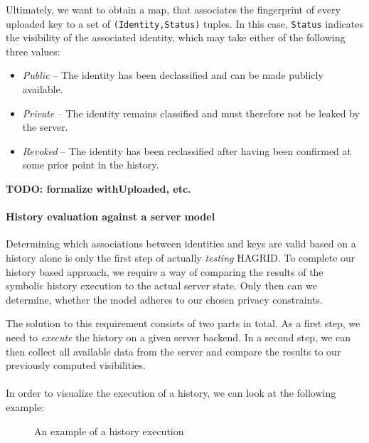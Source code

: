 Ultimately, we want to obtain a map, that associates the fingerprint of every uploaded key to a set of \texttt{(Identity,Status)} tuples. In this case, \texttt{Status} indicates the visibility of the associated identity, which may take either of the following three values: 
\begin{itemize}
    \item \emph{Public} -- The identity has been declassified and can be made publicly available.
    \item \emph{Private} -- The identity remains classified and must therefore not be leaked by the server.
    \item \emph{Revoked} -- The identity has been reclassified after having been confirmed at some prior point in the history.
\end{itemize}

\textbf{TODO: formalize withUploaded, etc. }

\paragraph{History evaluation against a server model}
Determining which associations between identities and keys are valid based on a history alone is only the first step of actually \emph{testing} HAGRID. To complete our history based approach, we require a way of comparing the results of the symbolic history execution to the actual server state. Only then can we determine, whether the model adheres to our chosen privacy constraints.



The solution to this requirement consists of two parts in total. As a first step, we need to \emph{execute} the history on a given server backend. In a second step, we can then collect all available data from the server and compare the results to our previously computed visibilities. 
\\ \\
In order to visualize the execution of a history, we can look at the following example: 
\begin{figure}[H]
    \label{fig:history}
    \centering
    \caption{An example of a history execution}
\end{figure}

